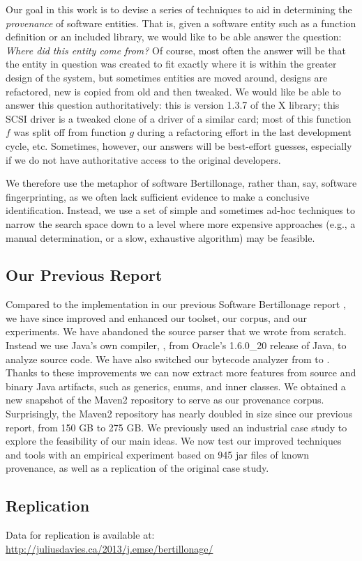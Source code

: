 Our goal in this work is to devise a series of techniques to aid in
determining the \emph{provenance} of software entities.  That is, given a
software entity such as a function definition or an included library, we
would like to be able answer the question:  \emph{Where did this entity
come from?}  Of course, most often the answer will be that the entity in
question was created to fit exactly where it is within the greater design
of the system, but sometimes entities are moved around, designs are
refactored, new is copied from old and then tweaked.  We would like be able
to answer this question authoritatively: this is version 1.3.7 of the X
library; this SCSI driver is a tweaked clone of a driver of a similar card;
most of this function $f$ was split off from function $g$ during a
refactoring effort in the last development cycle, etc.  Sometimes, however,
our answers will be best-effort guesses, especially if we do not have
authoritative access to the original developers.  

We therefore use the metaphor of software Bertillonage, rather than, say,
software fingerprinting, as we often lack sufficient evidence to make a
conclusive identification.  Instead, we use a set of simple and sometimes
ad-hoc techniques to narrow the search space down to a level where
more expensive approaches (e.g., a manual determination, or a slow, exhaustive
algorithm) may be feasible.

\subsection{Our Previous Report}

Compared to the implementation in our previous Software Bertillonage report
\cite{DaviesGGH11}, we have since improved and enhanced our toolset, our
corpus, and our experiments.  We have abandoned the source parser that we wrote
from scratch.  Instead we use Java's own compiler, , from
Oracle's 1.6.0\_20 release of Java, to
analyze source code.  We have also switched our bytecode analyzer from
 to .  Thanks to these improvements we can
now extract more features from source and binary Java artifacts, such as generics, enums, and
inner classes.  We obtained a new snapshot of the Maven2 repository to
serve as our provenance corpus.  Surprisingly, the Maven2 repository has
nearly doubled in size since our previous report, from 150 GB to 275 GB.
We previously used an industrial case study to explore the feasibility of our
main ideas.  We now test our improved techniques and tools with an
empirical experiment based on 945 jar files of known provenance, as well as
a replication of the original case study.


\subsection{Replication}
\noindent Data for replication is available at:\\
\url{http://juliusdavies.ca/2013/j.emse/bertillonage/}


